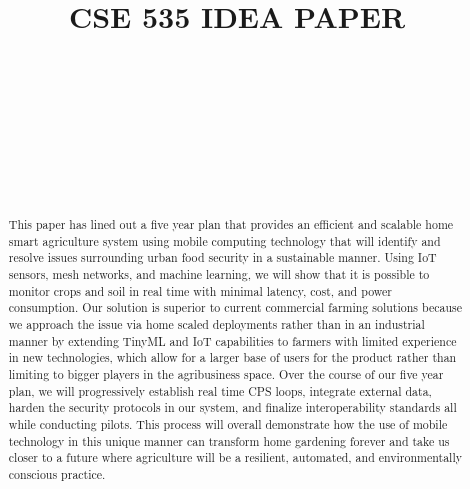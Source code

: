 \documentclass{sigchi}
\def\plaintitle{CSE 535 IDEA PAPER}
\begin{document}
\title{\plaintitle}

\author{%
  \\
  \\
  \\
  \\
  \\
  \\
    \\
}

\maketitle

\begin{abstract}
This paper has lined out a five year plan that provides an efficient and scalable home smart agriculture system using mobile computing technology that will identify and resolve issues surrounding urban food security in a sustainable manner. Using IoT sensors, mesh networks, and machine learning, we will show that it is possible to monitor crops and soil in real time with minimal latency, cost, and power consumption. Our solution is superior to current commercial farming solutions because we approach the issue via home scaled deployments rather than in an industrial manner by extending TinyML and IoT capabilities to farmers with limited experience in new technologies, which allow for a larger base of users for the product rather than limiting to bigger players in the agribusiness space. Over the course of our five year plan, we will progressively establish real time CPS loops, integrate external data, harden the security protocols in our system, and finalize interoperability standards all while conducting pilots. This process will overall demonstrate how the use of mobile technology in this unique manner can transform home gardening forever and take us closer to a future where agriculture will be a resilient, automated, and environmentally conscious practice.
\end{abstract}
\end{document}
